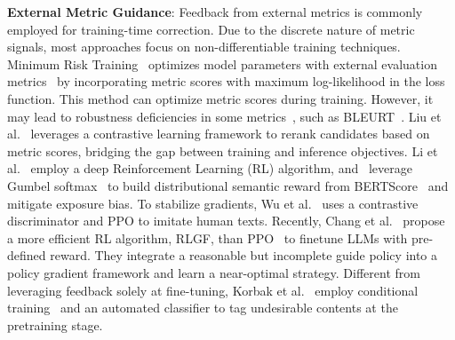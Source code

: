 \documentclass[a4paper,oneside]{book}
\begin{document}
\textbf{External Metric Guidance}: Feedback from external metrics is commonly employed for training-time correction. Due to the discrete nature of metric signals, most approaches focus on non-differentiable training techniques. Minimum Risk Training~\cite{shen-etal-2016-minimum} optimizes model parameters with external evaluation metrics~\cite{xu-etal-2022-errors, xu-etal-2023-sescore2} by incorporating metric scores with maximum log-likelihood in the loss function. This method can optimize metric scores during training. However, it may lead to robustness deficiencies in some metrics~\cite{yan-etal-2023-bleurt}, such as BLEURT~\cite{sellam-etal-2020-bleurt}. Liu et al.~\cite{liu-liu-2021-simcls} leverages a contrastive learning framework to rerank candidates based on metric scores, bridging the gap between training and inference objectives. Li et al.~\cite{li-etal-2019-deep} employ a deep Reinforcement Learning (RL) algorithm, and~\cite{jauregi-unanue-etal-2021-berttune} leverage Gumbel softmax~\cite{jang2017categorical} to build distributional semantic reward from BERTScore~\cite{zhang2020bertscore} and mitigate exposure bias. To stabilize gradients, Wu et al.~\cite{wu2021textgail} uses a contrastive discriminator and PPO to imitate human texts. Recently, Chang et al.~\cite{chang2023learning} propose a more efficient RL algorithm, RLGF, than PPO~\cite{schulman2017proximal} to finetune LLMs with pre-defined reward. They integrate a reasonable but incomplete guide policy into a policy gradient framework and learn a near-optimal strategy. Different from leveraging feedback solely at fine-tuning, Korbak et al.~\cite{korbak2023pretraining} employ conditional training~\cite{keskar2019ctrl} and an automated classifier to tag undesirable contents at the pretraining stage.
\end{document}
